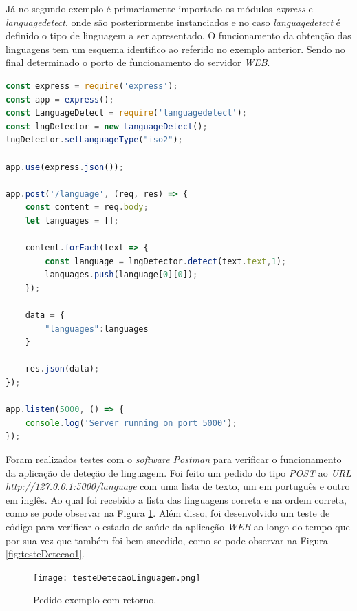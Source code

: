 Já no segundo exemplo é primariamente importado os módulos \textit{express} e \textit{languagedetect}, onde são posteriormente instanciados e no caso \textit{languagedetect} é definido o tipo de linguagem a ser apresentado. O funcionamento da obtenção das linguagens tem um esquema identifico ao referido no exemplo anterior. Sendo no final determinado o porto de funcionamento do servidor \textit{WEB}.

\begin{minipage}{0.9\linewidth}
\begin{lstlisting}[language=javascript, caption=Serviço de deteção de linguagem., label=lst:nodejs]
const express = require('express');
const app = express();
const LanguageDetect = require('languagedetect');
const lngDetector = new LanguageDetect();
lngDetector.setLanguageType("iso2");

app.use(express.json());

app.post('/language', (req, res) => {
    const content = req.body;
    let languages = [];

    content.forEach(text => {
        const language = lngDetector.detect(text.text,1);
        languages.push(language[0][0]);
    });

    data = {
        "languages":languages
    }

    res.json(data);
});

app.listen(5000, () => {
    console.log('Server running on port 5000');
});


\end{lstlisting}
\end{minipage}

Foram realizados testes com o \textit{software Postman} para verificar o funcionamento da aplicação de deteção de linguagem. Foi feito um pedido do tipo \textit{POST} ao \textit{URL http://127.0.0.1:5000/language} com uma lista de texto, um em português e outro em inglês. Ao qual foi recebido a lista das linguagens correta e na ordem correta, como se pode observar na Figura \ref{fig:testeDetecao}. Além disso, foi desenvolvido um teste de código para verificar o estado de saúde da aplicação \textit{WEB} ao longo do tempo que por sua vez que também foi bem sucedido, como se pode observar na Figura \ref{fig:testeDetecao1}.

\begin{figure}[H]
	\centering
	\texttt{[image: testeDetecaoLinguagem.png]}
	\caption{Pedido exemplo com retorno.}
	\label{fig:testeDetecao}
\end{figure}

